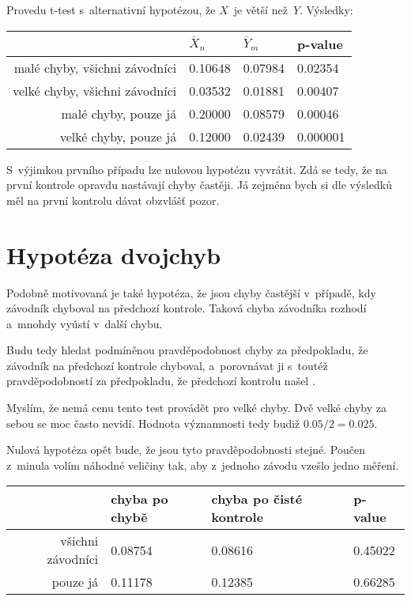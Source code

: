 \documentclass[a4paper,11pt]{article}
\begin{document}
Provedu t-test s~alternativní hypotézou, že $X$~je větší než~$Y$. Výsledky:

\begin{tabular}{r | l | l | l}
     & $\overline{X}_n$ & $\overline{Y}_m$ & p-value  \\
    \hline
    malé chyby, všichni závodníci  & 0.10648 & 0.07984 & 0.02354  \\
    velké chyby, všichni závodníci & 0.03532 & 0.01881 & 0.00407  \\
    malé chyby, pouze já           & 0.20000 & 0.08579 & 0.00046  \\
    velké chyby, pouze já          & 0.12000 & 0.02439 & 0.000001 \\
\end{tabular}

S~výjimkou prvního případu lze nulovou hypotézu vyvrátit. Zdá se tedy, že na
první kontrole opravdu nastávají chyby častěji. Já zejména bych si dle výsledků
měl na první kontrolu dávat obzvlášť pozor.

\section*{Hypotéza dvojchyb}

Podobně motivovaná je také hypotéza, že jsou chyby častější v~případě, kdy
závodník chyboval na předchozí kontrole. Taková chyba závodníka rozhodí a~mnohdy
vyústí v~další chybu.

Budu tedy hledat podmíněnou pravděpodobnost chyby za předpokladu, že závodník na
předchozí kontrole chyboval, a~porovnávat ji s~toutéž pravděpodobností za
předpokladu, že předchozí kontrolu našel .

Myslím, že nemá cenu tento test provádět pro velké chyby. Dvě velké chyby za
sebou se moc často nevidí. Hodnota významnosti tedy budiž $0.05 / 2 = 0.025$.

Nulová hypotéza opět bude, že jsou tyto pravděpodobnosti stejné. Poučen z~minula
volím náhodné veličiny tak, aby z~jednoho závodu vzešlo jedno měření.

\begin{tabular}{r | l | l | l}
    & chyba po chybě & chyba po čisté kontrole & p-value \\
   \hline
   všichni závodníci  & 0.08754 & 0.08616 & 0.45022 \\
   pouze já           & 0.11178 & 0.12385 & 0.66285 \\
\end{tabular}
\end{document}
